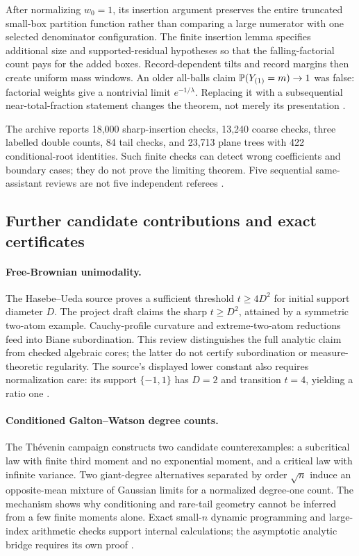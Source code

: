 After normalizing $w_0=1$, its insertion argument preserves the entire truncated small-box partition function rather than comparing a large numerator with one selected denominator configuration. The finite insertion lemma specifies additional size and supported-residual hypotheses so that the falling-factorial count pays for the added boxes. Record-dependent tilts and record margins then create uniform mass windows. An older all-balls claim $\mathbb{P}(Y_{(1)}=m)\to1$ was false: factorial weights give a nontrivial limit $e^{-1/\lambda}$. Replacing it with a subsequential near-total-fraction statement changes the theorem, not merely its presentation \citep{CaseJanson2026}.

The archive reports 18,000 sharp-insertion checks, 13,240 coarse checks, three labelled double counts, 84 tail checks, and 23,713 plane trees with 422 conditional-root identities. Such finite checks can detect wrong coefficients and boundary cases; they do not prove the limiting theorem. Five sequential same-assistant reviews are not five independent referees \citep{CaseJansonAudit2026}.

\subsection{Further candidate contributions and exact certificates}

\paragraph{Free-Brownian unimodality.}
The Hasebe--Ueda source proves a sufficient threshold $t\geq4D^2$ for initial support diameter $D$. The project draft claims the sharp $t\geq D^2$, attained by a symmetric two-atom example. Cauchy-profile curvature and extreme-two-atom reductions feed into Biane subordination. This review distinguishes the full analytic claim from checked algebraic cores; the latter do not certify subordination or measure-theoretic regularity. The source's displayed lower constant also requires normalization care: its support $\{-1,1\}$ has $D=2$ and transition $t=4$, yielding a ratio one \citep{HasebeUeda2018,CaseFreeUnimodality2026}.

\paragraph{Conditioned Galton--Watson degree counts.}
The Th\'evenin campaign constructs two candidate counterexamples: a subcritical law with finite third moment and no exponential moment, and a critical law with infinite variance. Two giant-degree alternatives separated by order $\sqrt n$ induce an opposite-mean mixture of Gaussian limits for a normalized degree-one count. The mechanism shows why conditioning and rare-tail geometry cannot be inferred from a few finite moments alone. Exact small-$n$ dynamic programming and large-index arithmetic checks support internal calculations; the asymptotic analytic bridge requires its own proof \citep{TheveninDegreeCounts,CaseThevenin2026}.

